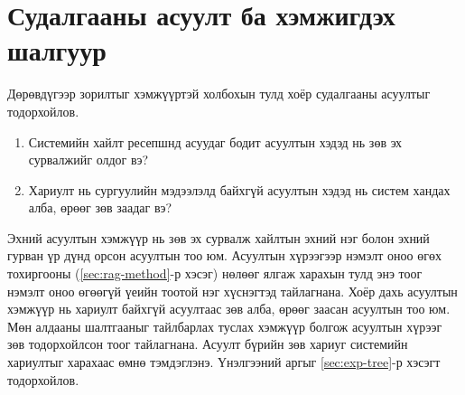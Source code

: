 \section{Судалгааны асуулт ба хэмжигдэх шалгуур}
\label{sec:rq}

Дөрөвдүгээр зорилтыг хэмжүүртэй холбохын тулд хоёр судалгааны асуултыг тодорхойлов.
\begin{enumerate}
    \item Системийн хайлт ресепшнд асуудаг бодит асуултын хэдэд нь зөв эх сурвалжийг олдог вэ?
    \item Хариулт нь сургуулийн мэдээлэлд байхгүй асуултын хэдэд нь систем хандах алба, өрөөг зөв заадаг вэ?
\end{enumerate}

Эхний асуултын хэмжүүр нь зөв эх сурвалж хайлтын эхний нэг болон эхний гурван үр дүнд орсон асуултын тоо юм. Асуултын хүрээгээр нэмэлт оноо өгөх тохиргооны (\ref{sec:rag-method}-р хэсэг) нөлөөг ялгаж харахын тулд энэ тоог нэмэлт оноо өгөөгүй үеийн тоотой нэг хүснэгтэд тайлагнана. Хоёр дахь асуултын хэмжүүр нь хариулт байхгүй асуултаас зөв алба, өрөөг заасан асуултын тоо юм. Мөн алдааны шалтгааныг тайлбарлах туслах хэмжүүр болгож асуултын хүрээг зөв тодорхойлсон тоог тайлагнана. Асуулт бүрийн зөв хариуг системийн хариултыг харахаас өмнө тэмдэглэнэ. Үнэлгээний аргыг \ref{sec:exp-tree}-р хэсэгт тодорхойлов.

